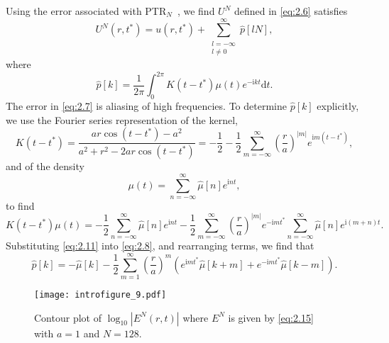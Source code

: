 \documentclass{article}[12pt]
\numberwithin{equation}{section}
\begin{document}
Using the error associated with
PTR$_{N}$~\cite{davis1959ptr}, we find $U^{N}$
defined in \eqref{eq:2.6} satisfies
\begin{equation}
  U^{N}(r,t^{\ast}) = u(r,t^{\ast}) + \sum_{\substack{l = -\infty\\l
      \neq 0}}^{\infty} \hat{p}[lN],
  \label{eq:2.7}
\end{equation}
where
\begin{equation}
  \hat{p}[k] = \frac{1}{2\pi} \int_{0}^{2\pi} K(t - t^{\ast}) \mu(t)
  e^{-\mathrm{i} k t } \mathrm{d}t.
  \label{eq:2.8}
\end{equation}
The error in \eqref{eq:2.7} is aliasing of high frequencies.  To
determine $\hat{p}[k]$ explicitly, we use the Fourier series
representation of the kernel,
\begin{equation}
  K(t-t^{\ast}) = \frac{ ar  \cos ( t - t^{\ast} )
    -a^2 }{a ^{2}+ r^2 - 2  ar\cos ( t - t^{\ast} )} =
  -\frac{1}{2} -  \frac{1}{2} \sum_{m = -\infty}^{\infty}
  \left( \frac{r}{a} \right)^{|m|} e^{\mathrm{i} m (t - t^{\ast})},
  \label{eq:2.9}
\end{equation} 
and of the density
\begin{equation}
  \mu(t) = \sum_{n = -\infty}^{\infty} \hat{\mu}[n] e^{\mathrm{i} n t},
  \label{eq:2.10}
\end{equation}
to find 
\begin{equation}
  K(t - t^{\ast}) \mu(t) = -\frac{1}{2} \sum_{n =
    -\infty}^{\infty} \hat{  {\mu}}[n] e^{\mathrm{i} n t} -\frac{1}{2}
  \sum_{m = -\infty}^{\infty} \left( \frac{r}{a} \right)^{|m|}
  e^{-\mathrm{i} m t^{\ast}} \sum_{n = -\infty}^{\infty} \hat{\mu}[n]
  e^{\mathrm{i} (m + n) t}.
  \label{eq:2.11}
\end{equation}
Substituting \eqref{eq:2.11} into \eqref{eq:2.8}, and
rearranging terms, we find that
\begin{equation}
  \hat{p}[k] = -\hat{\mu}[k] -\frac{1}{2} \sum_{m = 1}^{\infty} \left(
    \frac{r}{a} \right)^{m} \left( e^{\mathrm{i} m t^{\ast}}
    \hat{\mu}[k+m] + e^{-\mathrm{i} m t^{\ast}} \hat{\mu}[k-m] \right).
  \label{eq:2.12}
\end{equation}

\begin{figure}[t]
  \centering
 \texttt{[image: introfigure\_9.pdf]}
  
 \caption{Contour plot of $\log_{10} |E^{N}(r,t)|$ where $E^{N}$ is
   given by \eqref{eq:2.15} with $a = 1$ and $N = 128$.}
  \label{fig:2}
\end{figure}
\end{document}
